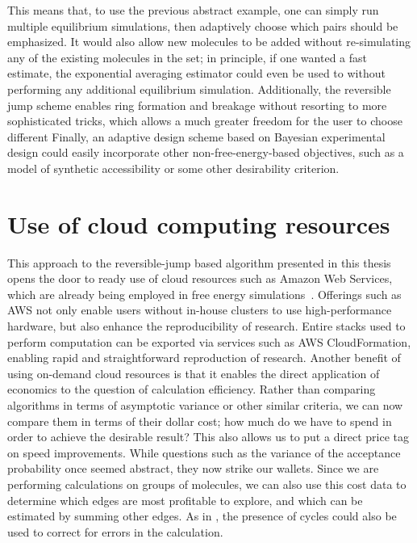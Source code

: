 %
This means that, to use the previous abstract example, one can simply run multiple equilibrium simulations, then adaptively choose which pairs should be emphasized.
%
It would also allow new molecules to be added without re-simulating any of the existing molecules in the set; in principle, if one wanted a fast estimate, the exponential averaging estimator could even be used to without performing any additional equilibrium simulation.
%
Additionally, the reversible jump scheme enables ring formation and breakage without resorting to more sophisticated tricks, which allows a much greater freedom for the user to choose different 
%
Finally, an adaptive design scheme based on Bayesian experimental design could easily incorporate other non-free-energy-based objectives, such as a model of synthetic accessibility or some other desirability criterion.
%
\section{Use of cloud computing resources}
%
This approach to the reversible-jump based algorithm presented in this thesis opens the door to ready use of cloud resources such as Amazon Web Services, which are already being employed in free energy simulations~\cite{Cournia2017}.
%
Offerings such as AWS not only enable users without in-house clusters to use high-performance hardware, but also enhance the reproducibility of research.
%
Entire stacks used to perform computation can be exported via services such as AWS CloudFormation, enabling rapid and straightforward reproduction of research.
%
Another benefit of using on-demand cloud resources is that it enables the direct application of economics to the question of calculation efficiency.
%
Rather than comparing algorithms in terms of asymptotic variance or other similar criteria, we can now compare them in terms of their dollar cost; how much do we have to spend in order to achieve the desirable result?
%
This also allows us to put a direct price tag on speed improvements.
%
While questions such as the variance of the acceptance probability once seemed abstract, they now strike our wallets.
%
Since we are performing calculations on groups of molecules, we can also use this cost data to determine which edges are most profitable to explore, and which can be estimated by summing other edges.
%
As in \cite{Wang2015}, the presence of cycles could also be used to correct for errors in the calculation.
%
